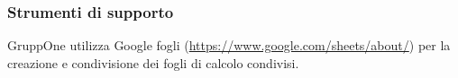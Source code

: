 \documentclass[../../norme-di-progetto.tex]{subfiles}
\begin{document}
\subsubsection{Strumenti di supporto}%
\label{subs:gestione-di-processo/strumenti_di_supporto}

GruppOne utilizza Google fogli (\href{https://www.google.com/sheets/about/}{https://www.google.com/sheets/about/}) per la creazione e condivisione dei fogli di calcolo condivisi.
\end{document}
